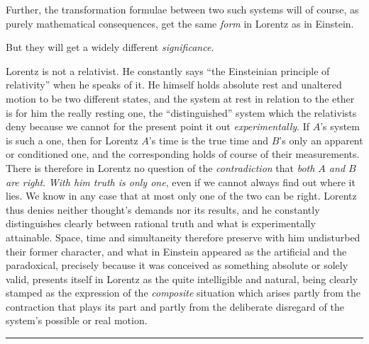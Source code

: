 \documentclass[12pt,a4paper]{article}
\begin{document}
Further, the transformation formulae between two such systems will of course,
as purely mathematical consequences, get the same \emph{form} in Lorentz as in
Einstein.

But they will get a widely different \emph{significance}.

Lorentz is not a relativist. He constantly says ``the Einsteinian principle of
relativity'' when he speaks of it. He himself holds absolute rest and
unaltered motion to be two different states, and the system at rest in
relation to the ether is for him the really resting one, the ``distinguished''
system which the relativists deny because we cannot for the present point it
out \emph{experimentally}. If $A$'s system is such a one, then for Lorentz
$A$'s time is the true time and $B$'s only an apparent or conditioned one, and
the corresponding holds of course of their measurements. There is therefore in
Lorentz no question of the \emph{contradiction} that \emph{both $A$ and $B$
are right}. \emph{With him truth is only one}, even if we cannot always find
out where it lies. We know in any case that at most only one of the two can be
right. Lorentz thus denies neither thought's demands nor its results, and he
constantly distinguishes clearly between rational truth and what is
experimentally attainable. Space, time and simultaneity therefore preserve
with him undisturbed their former character, and what in Einstein appeared as
the artificial and the paradoxical, precisely because it was conceived as
something absolute or solely valid, presents itself in Lorentz as the quite
intelligible and natural, being clearly stamped as the expression of the
\emph{composite} situation which arises partly from the contraction that plays
its part and partly from the deliberate disregard of the system's possible or
real motion.

\begin{center}
\rule{0.16\textwidth}{0.5pt}
\end{center}
\end{document}
